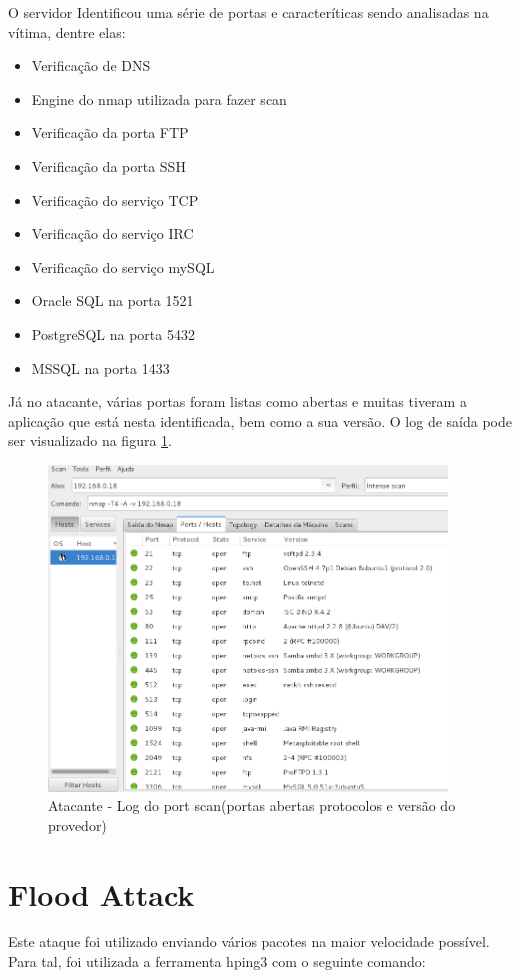 	O servidor Identificou uma série de portas e caracteríticas sendo analisadas na
	vítima, dentre elas:

	\begin{itemize}
		\item Verificação de DNS
		\item Engine do nmap utilizada para fazer scan
		\item Verificação da porta FTP
		\item Verificação da porta SSH
		\item Verificação do serviço TCP
		\item Verificação do serviço IRC
		\item Verificação do serviço mySQL
		\item Oracle SQL na porta 1521
		\item PostgreSQL na porta 5432
		\item MSSQL na porta 1433
	\end{itemize}

	Já no atacante, várias portas foram listas como abertas e muitas tiveram a aplicação
	que está nesta identificada, bem como a sua versão. O log de saída pode ser visualizado
	na figura \ref{fig:atacante_log_port_scan}.

	 \begin{figure}[h]
 	 \centering
 	 \includegraphics[width=400px, scale=1]{resource/atacante_log_port_scan}
 	 \caption{Atacante - Log do port scan(portas abertas protocolos e versão do provedor)}
  \label{fig:atacante_log_port_scan}
  \end{figure}

	\section{Flood Attack}
	\label{sec:Flood_Attack}
	Este ataque foi utilizado enviando vários pacotes na maior velocidade possível.
	Para tal, foi utilizada a ferramenta hping3 com o seguinte comando:

